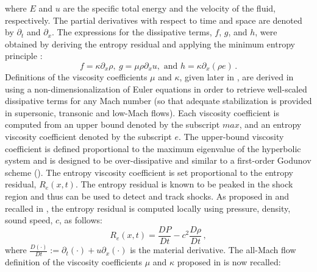 \documentclass{inputs/mc2015}
\begin{document}
%
where $E$ and $u$ are the specific total energy and the velocity of the fluid, respectively. The partial derivatives with respect to time and space are denoted by $\partial_t$ and $\partial_x$. The expressions for the dissipative terms, $f$, $g$, and $h$, were obtained by deriving the entropy residual and applying the minimum entropy principle \cite{jlg}:
%
\begin{equation}
f = \kappa \partial_x \rho , \ g = \mu \rho \partial_x u, \text{  and  } h = \kappa \partial_x \left( \rho e \right) \, . 
\end{equation}
%
Definitions of the viscosity coefficients $\mu$ and $\kappa$, given later in , are derived in \cite{Marco_paper_low_mach} using a non-dimensionalization of Euler equations in order to retrieve well-scaled dissipative terms for any Mach number (so that adequate stabilization is provided in supersonic, transonic and low-Mach flows). Each viscosity coefficient is computed from an upper bound denoted by the subscript $max$, and an entropy viscosity coefficient denoted by the subscript $e$. The upper-bound viscosity coefficient is defined proportional to the maximum eigenvalue of the hyperbolic system and is designed to be over-dissipative and similar to a first-order Godunov scheme (). The entropy viscosity coefficient is set proportional to the entropy residual, $R_e(x,t)$.
The entropy residual is known to be peaked in the shock region \cite{Leveque} and thus can be used to detect and track shocks. As proposed in \cite{Marco_paper_low_mach} and recalled in , the entropy residual is computed locally using pressure, density, sound speed, $c$, as follows:
%
\begin{equation}\label{eq:ent-res}
R_e(x,t) = \frac{DP}{Dt} - c^2\frac{D\rho}{Dt} \, ,
\end{equation}
%
where $\frac{D (\cdot)}{Dt} := \partial_t(\cdot) + u  \partial_x(\cdot)$ is the material derivative. 
The all-Mach flow definition of the viscosity coefficients $\mu$ and $\kappa$ proposed in \cite{Marco_paper_low_mach} is now recalled:
\end{document}
